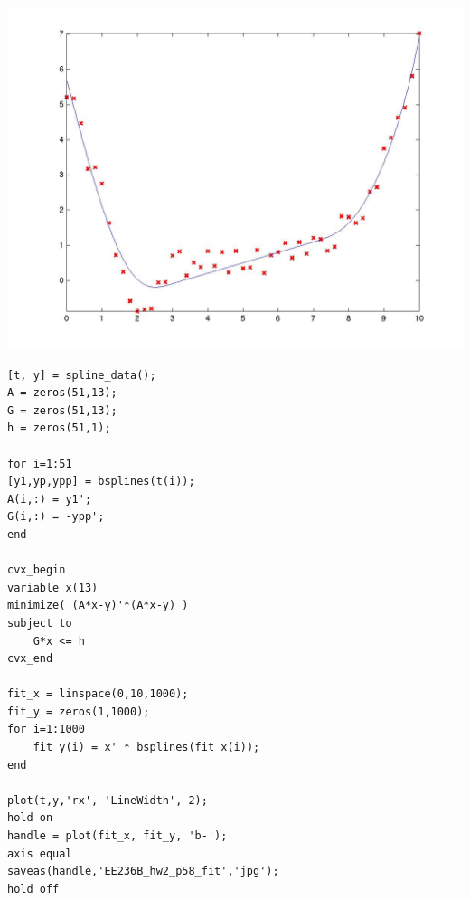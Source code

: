\documentclass[12pt,a4paper]{article}
\begin{document}
\begin{center}
\includegraphics[scale=0.25]{hw2_p58_fit.jpg}
\end{center}
\begin{verbatim}
[t, y] = spline_data();
A = zeros(51,13);
G = zeros(51,13);
h = zeros(51,1);

for i=1:51
[y1,yp,ypp] = bsplines(t(i));
A(i,:) = y1';
G(i,:) = -ypp';
end

cvx_begin 
variable x(13)
minimize( (A*x-y)'*(A*x-y) )
subject to 
    G*x <= h
cvx_end

fit_x = linspace(0,10,1000);
fit_y = zeros(1,1000);
for i=1:1000
    fit_y(i) = x' * bsplines(fit_x(i));
end

plot(t,y,'rx', 'LineWidth', 2);
hold on
handle = plot(fit_x, fit_y, 'b-');
axis equal
saveas(handle,'EE236B_hw2_p58_fit','jpg');
hold off
\end{verbatim}
\end{document}
